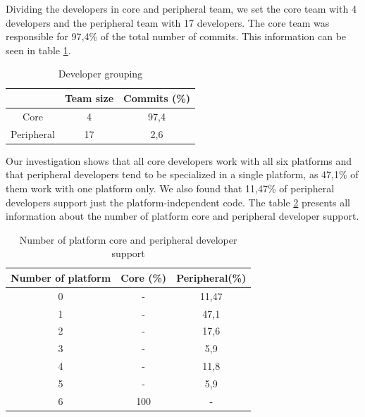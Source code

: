 \documentclass[10pt, conference]{IEEEtran}
\begin{document}
Dividing the developers in core and peripheral team, we set the core team with 4 developers and the peripheral team with 17 developers. The core team was responsible for 97,4\% of the total number of commits. This information can be seen in table \ref{devgrouping}.  


\begin{table}[h]
\renewcommand{\arraystretch}{1.3}
\caption{Developer grouping}
\label{devgrouping}
\centering
\begin{tabular}{|c|c|c|}
\hline
  & Team size   & Commits (\%) \\
\hline
Core & 4& 97,4 \\
\hline
Peripheral & 17 & 2,6\\
\hline
\end{tabular}
\end{table} 

Our investigation shows that all core developers work with all six platforms and that peripheral developers tend to be specialized in a single platform, as 47,1\% of them work with one platform only. We also found that 11,47\% of peripheral developers support just the platform-independent code. The table \ref{plat} presents all information about the number of platform core and peripheral developer support.    


\begin{table}[h]
\renewcommand{\arraystretch}{1.3}
\caption{Number of platform core and peripheral developer support}
\label{plat}
\centering
\begin{tabular}{|c|c|c|}
\hline
Number of platform & Core (\%) & Peripheral(\%)\\
\hline
0 & 	- & 	11,47 \\
\hline
1 & 	- & 	47,1 \\
\hline
2 & 	-& 		17,6\\
\hline
3 &		- &		5,9\\
\hline
4 & 	- & 	11,8\\
\hline
5 & 	- & 	5,9  \\
\hline
6 & 	100 & 	-  \\
\hline
\end{tabular}
\end{table} 
\end{document}
